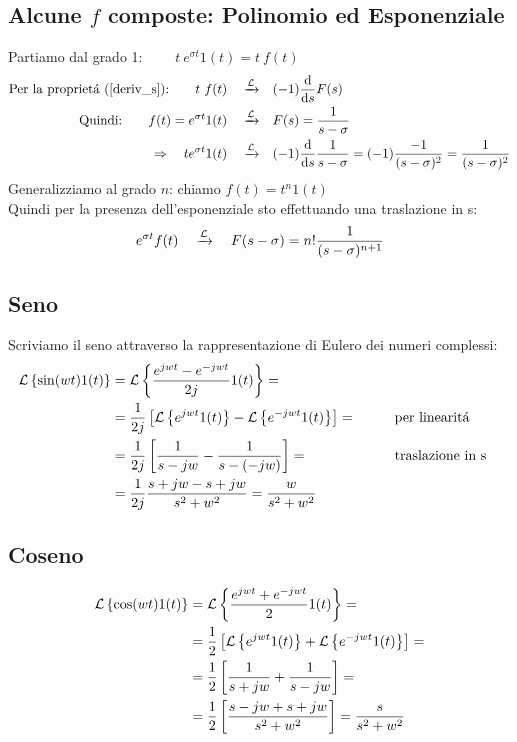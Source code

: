 \documentclass[../main.tex]{subfiles}
\begin{document}
	\subsection{Alcune $f$ composte: Polinomio ed Esponenziale}
	Partiamo dal grado 1: $ \qquad t\ e^{\sigma t} 1(t) = t\ f(t) $
	\begin{align*}
		\text{Per la propriet\'{a} (\ref{deriv_s}):} \qquad t\ f(t) \quad \xrightarrow{\mathcal{L}} \quad &(-1) \frac{\mathrm{d} }{\mathrm{d} s} F(s)\\
		\text{Quindi:} \qquad f(t) = e^{\sigma t} 1(t) \quad \xrightarrow{\mathcal{L}} \quad &F(s) = \frac{1}{s-\sigma}\\
		\Rightarrow \quad t e^{\sigma t} 1(t) \quad \xrightarrow{\mathcal{L}} \quad &(-1) \frac{\mathrm{d} }{\mathrm{d} s} \frac{1}{s-\sigma} = (-1) \frac{-1}{(s-\sigma)^2} = \frac{1}{(s-\sigma)^2}
	\end{align*}
		Generalizziamo al grado $n$: \quad chiamo \quad $f(t) = t^n 1(t)$\\
		Quindi per la presenza dell'esponenziale sto effettuando una traslazione in s:
		\[
			e^{\sigma t} f(t) \quad \xrightarrow{\mathcal{L}} \quad F(s-\sigma) = n! \frac{1}{(s-\sigma)^{n+1}}
		\]
	\subsection{Seno}
	\label{trasf_seno}
	Scriviamo il seno attraverso la rappresentazione di Eulero dei numeri complessi:
	\begin{align*}
		\mathcal{L} \left\lbrace \sin(wt) 1(t) \right\rbrace &= \mathcal{L} \left\lbrace \frac{e^{jwt} - e^{-jwt}}{2j} 1(t) \right\rbrace =\\
		&= \frac{1}{2j} \left[ \mathcal{L} \left\lbrace e^{jwt} 1(t) \right\rbrace - \mathcal{L} \left\lbrace e^{-jwt} 1(t) \right\rbrace \right]= \qquad &&\text{per linearit\'{a}}\\
		&= \frac{1}{2j} \left[ \frac{1}{s-jw} - \frac{1}{s-(-jw)} \right] = \qquad &&\text{traslazione in s}\\
		&= \frac{1}{2j} \frac{s+jw-s+jw}{s^2+w^2} = \frac{w}{s^2+w^2}
	\end{align*}
	\subsection{Coseno}
	\label{trasf_coseno}
	\begin{align*}
		\mathcal{L} \left\lbrace \cos(wt) 1(t) \right\rbrace &= \mathcal{L} \left\lbrace \frac{e^{jwt} + e^{-jwt}}{2} 1(t) \right\rbrace =\\
		&= \frac{1}{2} \left[ \mathcal{L} \left\lbrace e^{jwt} 1(t) \right\rbrace + \mathcal{L} \left\lbrace e^{-jwt} 1(t) \right\rbrace \right] =\\
		&= \frac{1}{2} \left[ \frac{1}{s+jw} + \frac{1}{s-jw} \right] =\\
		&= \frac{1}{2} \left[ \frac{s-jw+s+jw}{s^2+w^2} \right] = \frac{s}{s^2+w^2} \\
	\end{align*}
\end{document}

